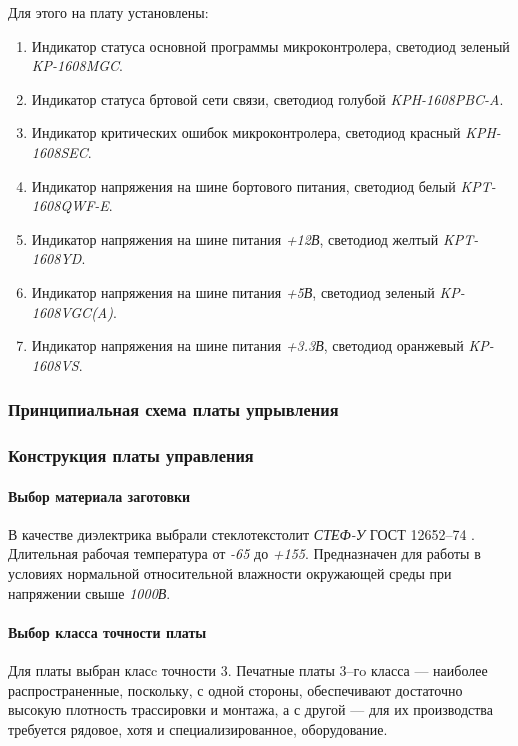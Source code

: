 Для этого на плату установлены:
\begin{enumerate}
    \item Индикатор статуса основной программы микроконтролера,
            светодиод зеленый \textit{KP-1608MGC}.
    \item Индикатор статуса бртовой сети связи,
            светодиод голубой \textit{KPH-1608PBC-A}.
    \item Индикатор критических ошибок микроконтролера,
            светодиод красный \textit{KPH-1608SEC}.
    \item Индикатор напряжения на шине бортового питания,
            светодиод белый \textit{KPT-1608QWF-E}.
    \item Индикатор напряжения на шине питания \textit{+12В},
            светодиод желтый \textit{KPT-1608YD}.
    \item Индикатор напряжения на шине питания \textit{+5В},
            светодиод зеленый \textit{KP-1608VGC(A)}.
    \item Индикатор напряжения на шине питания \textit{+3.3В},
            светодиод оранжевый \textit{KP-1608VS}.
\end{enumerate}

\subsubsection{Принципиальная схема платы упрывления}
\subsubsection{Конструкция платы управления}
\paragraph{Выбор материала заготовки}
В качестве диэлектрика выбрали стеклотекстолит
\textit{СТЕФ-У} ГОСТ 12652--74 \cite{GOST_12652_74}.
Длительная рабочая температура от \textit{-65\textcelsius}
до \textit{+155\textcelsius}.
Предназначен для работы в условиях нормальной относительной влажности
окружающей среды при напряжении свыше \textit{1000В}.

\paragraph{Выбор класса точности платы}
Для платы выбран класc точности 3.
Печатные платы 3--гo класса --- наиболее распространенные, поскольку, с одной
стороны, обеспечивают достаточно высокую плотность трассировки и монтажа, а с
другой --- для их производства требуется рядовое, хотя и специализированное,
оборудование.

